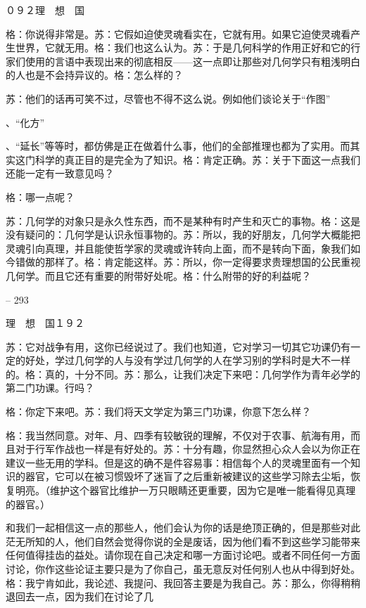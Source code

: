 \documentclass[11pt,oneside]{book}
\begin{document}
\begin{common-format}
    ０９２理　想　国

    格：你说得非常是。苏：它假如迫使灵魂看实在，它就有用。如果它迫使灵魂看产生世界，它就无用。格：我们也这么认为。苏：于是几何科学的作用正好和它的行家们使用的言语中表现出来的彻底相反——这一点即让那些对几何学只有粗浅明白的人也是不会持异议的。格：怎么样的？

    苏：他们的话再可笑不过，尽管也不得不这么说。例如他们谈论关于“作图”

    、“化方”

    、“延长”等等时，都仿佛是正在做着什么事，他们的全部推理也都为了实用。而其实这门科学的真正目的是完全为了知识。格：肯定正确。苏：关于下面这一点我们还能一定有一致意见吗？

    格：哪一点呢？

    苏：几何学的对象只是永久性东西，而不是某种有时产生和灭亡的事物。格：这是没有疑问的：几何学是认识永恒事物的。苏：所以，我的好朋友，几何学大概能把灵魂引向真理，并且能使哲学家的灵魂或许转向上面，而不是转向下面，象我们如今错做的那样了。格：肯定能这样。苏：所以，你一定得要求贵理想国的公民重视几何学。而且它还有重要的附带好处呢。格：什么附带的好的利益呢？

    

-- 293

    理　想　国１９２

    苏：它对战争有用，这你已经说过了。我们也知道，它对学习一切其它功课仍有一定的好处，学过几何学的人与没有学过几何学的人在学习别的学科时是大不一样的。格：真的，十分不同。苏：那么，让我们决定下来吧：几何学作为青年必学的第二门功课。行吗？

    格：你定下来吧。苏：我们将天文学定为第三门功课，你意下怎么样？

    格：我当然同意。对年、月、四季有较敏锐的理解，不仅对于农事、航海有用，而且对于行军作战也一样是有好处的。苏：十分有趣，你显然担心众人会以为你正在建议一些无用的学科。但是这的确不是件容易事：相信每个人的灵魂里面有一个知识的器官，它可以在被习惯毁坏了迷盲了之后重新被建议的这些学习除去尘垢，恢复明亮。（维护这个器官比维护一万只眼睛还更重要，因为它是唯一能看得见真理的器官。）

    和我们一起相信这一点的那些人，他们会认为你的话是绝顶正确的，但是那些对此茫无所知的人，他们自然会觉得你说的全是废话，因为他们看不到这些学习能带来任何值得挂齿的益处。请你现在自己决定和哪一方面讨论吧。或者不同任何一方面讨论，你作这些论证主要只是为了你自己，虽无意反对任何别人也从中得到好处。格：我宁肯如此，我论述、我提问、我回答主要是为我自己。苏：那么，你得稍稍退回去一点，因为我们在讨论了几

    


\end{common-format}
\end{document}
